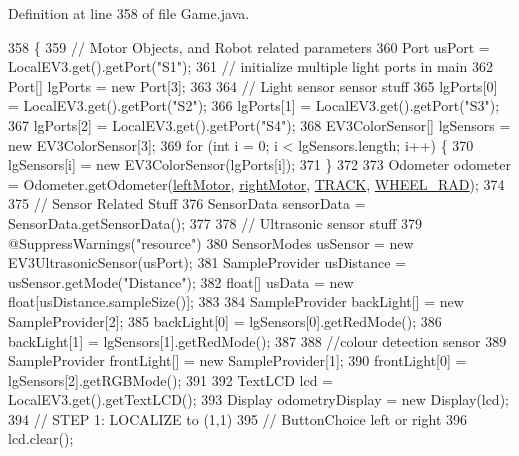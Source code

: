 Definition at line 358 of file Game.\+java.


\begin{DoxyCode}
358                                                       \{
359     \textcolor{comment}{// Motor Objects, and Robot related parameters}
360     Port usPort = LocalEV3.get().getPort(\textcolor{stringliteral}{"S1"});
361     \textcolor{comment}{// initialize multiple light ports in main}
362     Port[] lgPorts = \textcolor{keyword}{new} Port[3];
363 
364     \textcolor{comment}{// Light sensor sensor stuff}
365     lgPorts[0] = LocalEV3.get().getPort(\textcolor{stringliteral}{"S2"});
366     lgPorts[1] = LocalEV3.get().getPort(\textcolor{stringliteral}{"S3"});
367     lgPorts[2] = LocalEV3.get().getPort(\textcolor{stringliteral}{"S4"});
368     EV3ColorSensor[] lgSensors = \textcolor{keyword}{new} EV3ColorSensor[3];
369     \textcolor{keywordflow}{for} (\textcolor{keywordtype}{int} i = 0; i < lgSensors.length; i++) \{
370       lgSensors[i] = \textcolor{keyword}{new} EV3ColorSensor(lgPorts[i]);
371     \}
372 
373     Odometer odometer = Odometer.getOdometer(\hyperlink{enumca_1_1mcgill_1_1ecse211_1_1project_1_1_game_a7c673571bf50fdb6917a9d7bb671e003}{leftMotor}, \hyperlink{enumca_1_1mcgill_1_1ecse211_1_1project_1_1_game_a7a05fcf37c4435c32270776a427ba0d2}{rightMotor}, 
      \hyperlink{enumca_1_1mcgill_1_1ecse211_1_1project_1_1_game_a64cf12cdd6772ac1ce351ff1dfadd626}{TRACK}, \hyperlink{enumca_1_1mcgill_1_1ecse211_1_1project_1_1_game_a91bd64670c2a91d006c907142783b1f8}{WHEEL\_RAD});
374 
375     \textcolor{comment}{// Sensor Related Stuff}
376     SensorData sensorData = SensorData.getSensorData();
377 
378     \textcolor{comment}{// Ultrasonic sensor stuff}
379     @SuppressWarnings(\textcolor{stringliteral}{"resource"})
380     SensorModes usSensor = new EV3UltrasonicSensor(usPort);
381     SampleProvider usDistance = usSensor.getMode("Distance");
382     \textcolor{keywordtype}{float}[] usData = new \textcolor{keywordtype}{float}[usDistance.sampleSize()];
383 
384     SampleProvider backLight[] = new SampleProvider[2];
385     backLight[0] = lgSensors[0].getRedMode();
386     backLight[1] = lgSensors[1].getRedMode();
387     
388     \textcolor{comment}{//colour detection sensor}
389     SampleProvider frontLight[] = new SampleProvider[1];
390     frontLight[0] = lgSensors[2].getRGBMode();
391 
392     TextLCD lcd = LocalEV3.get().getTextLCD();
393     Display odometryDisplay = new Display(lcd);
394     \textcolor{comment}{// STEP 1: LOCALIZE to (1,1)}
395     \textcolor{comment}{// ButtonChoice left or right}
396     lcd.clear();

\end{DoxyCode}
